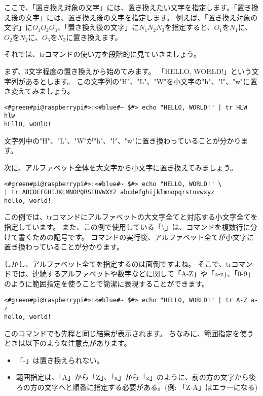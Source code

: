 ここで、「置き換え対象の文字」には、置き換えたい文字を指定します。「置き換え後の文字」には、置き換え後の文字を指定します。
例えば、「置き換え対象の文字」に$O_1O_2O_3$、「置き換え後の文字」に$N_1N_2N_3$を指定すると、$O_1$を$N_1$に、$O_2$を$N_2$に、$O_3$を$N_3$に置き換えます。

それでは、trコマンドの使い方を段階的に見ていきましょう。

まず、3文字程度の置き換えから始めてみます。
「HELLO, WORLD!」という文字列があるとします。
この文字列の"H"、"L"、"W"を小文字の"h"、"l"、"w"に置き変えてみましょう。

\begin{lstlisting}[caption=3文字の置き換え, label=tr_3_chars]
<#green#pi@raspberrypi#>:<#blue#~ $#> echo "HELLO, WORLD!" | tr HLW hlw
hEllO, wORlD!
\end{lstlisting}

文字列中の"H"、"L"、"W"が"h"、"l"、"w"に置き換わっていることが分かります。

次に、アルファベット全体を大文字から小文字に置き換えてみましょう。

\begin{lstlisting}[caption=アルファベット全体の置き換え, label=tr_all_chars]
<#green#pi@raspberrypi#>:<#blue#~ $#> echo "HELLO, WORLD!" \
| tr ABCDEFGHIJKLMNOPQRSTUVWXYZ abcdefghijklmnopqrstuvwxyz
hello, world!
\end{lstlisting}

この例では、trコマンドにアルファベットの大文字全てと対応する小文字全てを指定しています。
また、この例で使用している「\textbackslash」は、コマンドを複数行に分けて書くための記号です。
コマンドの実行後、アルファベット全てが小文字に置き換わっていることが分かります。

しかし、アルファベット全てを指定するのは面倒ですよね。
そこで、trコマンドでは、連続するアルファベットや数字などに関して「A-Z」や「a-z」、「0-9」のように範囲指定を使うことで簡潔に表現することができます。

\begin{lstlisting}[caption=範囲指定を使った置き換え, label=tr_range]
<#green#pi@raspberrypi#>:<#blue#~ $#> echo "HELLO, WORLD!" | tr A-Z a-z
hello, world!
\end{lstlisting}

このコマンドでも先程と同じ結果が表示されます。
ちなみに、範囲指定を使うときは以下のような注意点があります。
\begin{itemize}
    \item 「-」は置き換えられない。
    \item 範囲指定は、「A」から「Z」、「a」から「z」のように、前の方の文字から後ろの方の文字へと順番に指定する必要がある。(例: 「Z-A」はエラーになる) 
\end{itemize}

